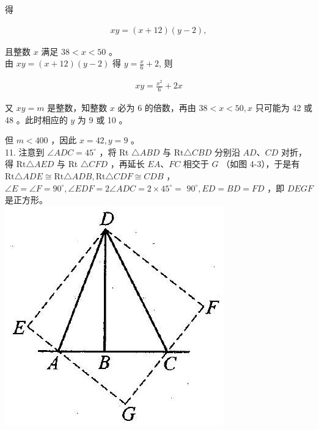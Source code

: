 \documentclass[10pt]{article}
\begin{document}
得

\begin{align*}
x y=(x+12)(y-2),
\end{align*}

且整数 $x$ 满足 $38<x<50$ 。\\
由 $x y=(x+12)(y-2)$ 得 $y=\frac{x}{6}+2$, 则

\begin{align*}
x y=\frac{x^{2}}{6}+2 x
\end{align*}

又 $x y=m$ 是整数，知整数 $x$ 必为 6 的倍数，再由 $38<x<50, x$ 只可能为 42 或 48 。此时相应的 $y$ 为 9 或 10 。

但 $m<400$ ，因此 $x=42, y=9$ 。\\
11. 注意到 $\angle A D C=45^{\circ}$ ，将 Rt $\triangle A B D$ 与 $\mathrm{Rt} \triangle C B D$ 分别沿 $A D 、 C D$ 对折，得 $\mathrm{Rt} \triangle A E D$ 与 Rt $\triangle C F D$ ，再延长 $E A 、 F C$ 相交于 $G$ （如图 4-3），于是有 $\mathrm{Rt} \triangle A D E \cong \mathrm{Rt} \triangle A D B, \mathrm{Rt} \triangle C D F \cong C D B$ ， $\angle E=\angle F=90^{\circ}, \angle E D F=2 \angle A D C=2 \times 45^{\circ}=$ $90^{\circ}, E D=B D=F D$ ，即 $D E G F$ 是正方形。\\
\includegraphics[max width=\textwidth, center]{2024_10_30_26b590fd1106d28139f0g-151}
\end{document}
